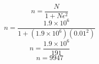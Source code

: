 \begin{equation}
    n=\frac{N}{1+N\epsilon^2}
\end{equation}
\begin{equation}
    n=\frac{1.9\times 10^6}{1+(1.9\times10^6)(0.01^2)}
\end{equation}
\begin{equation}
    n=\frac{1.9\times 10^6}{191}
\end{equation}
\begin{equation}
    n=9947
\end{equation}